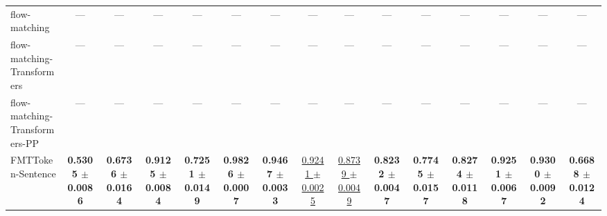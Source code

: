\begin{table}[H]
{\begin{tabular}{lcccccccccccccc}
flow-matching & — & — & — & — & — & — & — & — & — & — & — & — & — & — \\
flow-matching-Transformers & — & — & — & — & — & — & — & — & — & — & — & — & — & — \\
flow-matching-Transformers-PP & — & — & — & — & — & — & — & — & — & — & — & — & — & — \\
FMTToken-Sentence & \textbf{0.5305 $\pm$ 0.0086} & \textbf{0.6736 $\pm$ 0.0164} & \textbf{0.9125 $\pm$ 0.0084} & \textbf{0.7251 $\pm$ 0.0149} & \textbf{0.9826 $\pm$ 0.0007} & \textbf{0.9467 $\pm$ 0.0033} & \underline{0.9241 $\pm$ 0.0025} & \underline{0.8739 $\pm$ 0.0049} & \textbf{0.8232 $\pm$ 0.0047} & \textbf{0.7745 $\pm$ 0.0157} & \textbf{0.8274 $\pm$ 0.0118} & \textbf{0.9251 $\pm$ 0.0067} & \textbf{0.9300 $\pm$ 0.0092} & \textbf{0.6688 $\pm$ 0.0124} \\
\bottomrule
\end{tabular}
}
\label{tab:dbpedia14}
\end{table}

\begin{table}[H]
\centering
\caption{AP on Sms}
\label{tab:sms}
\end{table}


